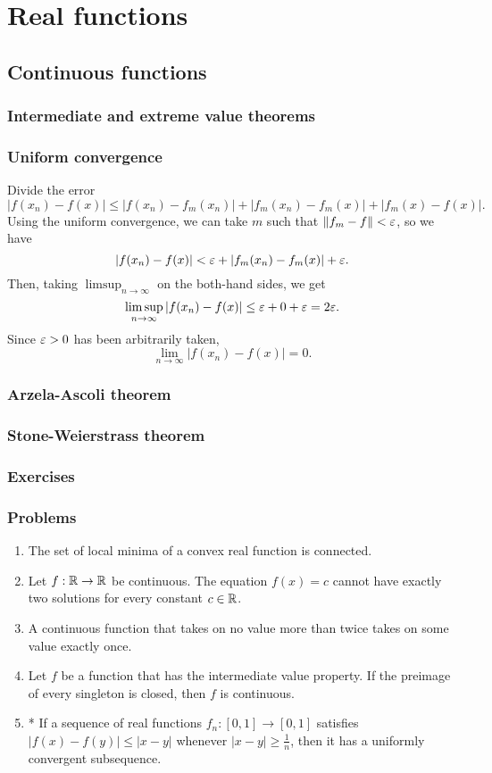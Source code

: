 \documentclass{../note}
\begin{document}
\part{Real functions}

\chapter{Continuous functions}
\section{Intermediate and extreme value theorems}
\section{Uniform convergence}

\begin{pf}
Divide the error
\[|f(x_n)-f(x)|\le|f(x_n)-f_m(x_n)|+|f_m(x_n)-f_m(x)|+|f_m(x)-f(x)|.\]
Using the uniform convergence, we can take $m$ such that $\|f_m-f\|<\varepsilon$, so we have
\[|f(x_n)-f(x)|<\varepsilon+|f_m(x_n)-f_m(x)|+\varepsilon.\]
Then, taking $\limsup_{n\to\infty}$ on the both-hand sides, we get
\[\limsup_{n\to\infty}|f(x_n)-f(x)|\le\varepsilon+0+\varepsilon=2\varepsilon.\]
Since $\varepsilon>0$ has been arbitrarily taken,
\[\lim_{n\to\infty}|f(x_n)-f(x)|=0.\]
\end{pf}

\section{Arzela-Ascoli theorem}
\section{Stone-Weierstrass theorem}

\section*{Exercises}

\section*{Problems}
\begin{enumerate}
\item The set of local minima of a convex real function is connected.
\item Let $f:\mathbb{R}\to\mathbb{R}$ be continuous.
The equation $f(x)=c$ cannot have exactly two solutions for every constant $c\in\mathbb{R}$.
\item A continuous function that takes on no value more than twice takes on some value exactly once.
\item Let $f$ be a function that has the intermediate value property.
If the preimage of every singleton is closed, then $f$ is continuous.
\item* If a sequence of real functions $f_n\colon[0,1]\to[0,1]$ satisfies $|f(x)-f(y)|\le|x-y|$ whenever $|x-y|\ge\frac1n$, then it has a uniformly convergent subsequence.
\end{enumerate}
\end{document}
